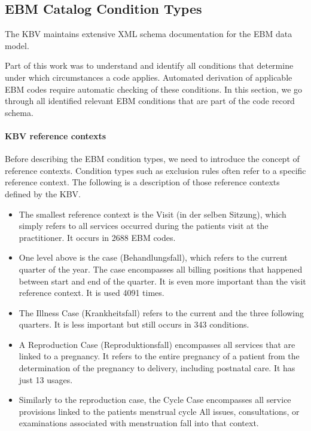 \subsection{EBM Catalog Condition Types}\label{subsec:ebm-conditions}
The KBV maintains extensive XML schema documentation for the EBM data model.

Part of this work was to understand and identify all conditions that determine under which circumstances a code applies.
Automated derivation of applicable EBM codes require automatic checking of these conditions.
In this section, we go through all identified relevant EBM conditions that are part of the code record schema.

\paragraph{KBV reference contexts}\label{par:kbv-reference-contexts}
Before describing the EBM condition types, we need to introduce the concept of reference contexts.
Condition types such as exclusion rules often refer to a specific reference context.
The following is a description of those reference contexts defined by the KBV.
\begin{itemize}
    \item The smallest reference context is the Visit (in der selben Sitzung), which simply refers to all services occurred during the patients visit at the practitioner.
    It occurs in 2688 EBM codes.
    \item One level above is the case (Behandlungsfall), which refers to the current quarter of the year.
     The case encompasses all billing positions that happened between start and end of the quarter.
    It is even more important than the visit reference context.
    It is used 4091 times.
    \item The Illness Case (Krankheitsfall) refers to the current and the three following quarters.
    It is less important but still occurs in 343 conditions.
    \item A Reproduction Case (Reproduktionsfall) encompasses all services that are linked to a pregnancy.
    It refers to the entire pregnancy of a patient from the determination of the pregnancy to delivery, including postnatal care.
    It has just 13 usages.
    \item Similarly to the reproduction case, the Cycle Case encompasses all service provisions linked to the patients menstrual cycle
    All issues, consultations, or examinations associated with menstruation fall into that context.
\end{itemize}
